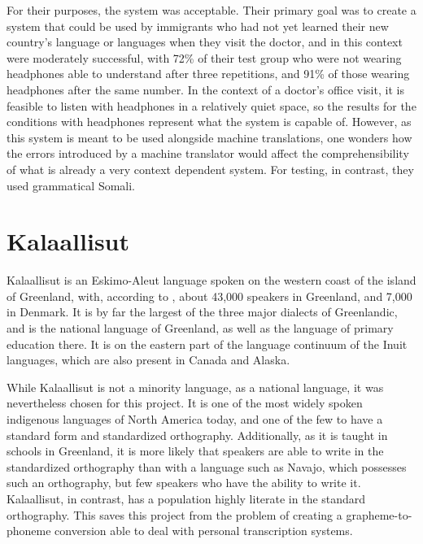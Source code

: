 \documentclass[12pt]{article}
\begin{document}
		For their purposes, the system was acceptable. Their primary goal was to create a system that could be used by immigrants who had not yet learned their new country's language or languages when they visit the doctor, and in this context were moderately successful, with 72\% of their test group who were not wearing headphones able to understand after three repetitions, and 91\% of those wearing headphones after the same number. In the context of a doctor's office visit, it is feasible to listen with headphones in a relatively quiet space, so the results for the conditions with headphones represent what the system is capable of. However, as this system is meant to be used alongside machine translations, one wonders how the errors introduced by a machine translator would affect the comprehensibility of what is already a very context dependent system. For testing, in contrast, they used grammatical Somali.\par

\section{Kalaallisut}

Kalaallisut is an Eskimo-Aleut language spoken on the western coast of the island of Greenland, with, according to \citet{ethnologue}, about 43,000 speakers in Greenland, and 7,000 in Denmark. It is by far the largest of the three major dialects of Greenlandic, and is the national language of Greenland, as well as the language of primary education there. It is on the eastern part of the language continuum of the Inuit languages, which are also present in Canada and Alaska. \par

While Kalaallisut is not a minority language, as a national language, it was nevertheless chosen for this project. It is one of the most widely spoken indigenous languages of North America today, and one of the few to have a standard form and standardized orthography. Additionally, as it is taught in schools in Greenland, it is more likely that speakers are able to write in the standardized orthography than with a language such as Navajo, which possesses such an orthography, but few speakers who have the ability to write it. Kalaallisut, in contrast, has a population highly literate in the standard orthography. This saves this project from the problem of creating a grapheme-to-phoneme conversion able to deal with personal transcription systems. \par
\end{document}
